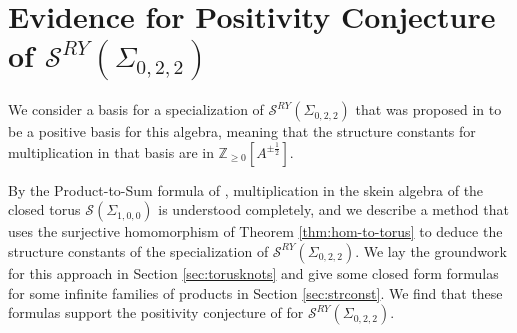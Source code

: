 \documentclass{article}
\newcommand{\del}{\partial}
\newcommand{\Z}{\mathbb{Z}}
\newcommand{\id}{\text{id}}
\renewcommand{\v}{\mathbf{v}}
\renewcommand{\a}{\alpha}
\renewcommand{\b}{\beta}
\renewcommand{\S}{\mathcal{S}}
\newcommand{\san}{\Sigma_{0,2,2}}
\newcommand{\sto}{\Sigma_{1,0,0}}
\theoremstyle{definition}
\renewcommand{\a}{\alpha}
\renewcommand{\b}{\beta}
\renewcommand{\san}{\Sigma_{0, 2, 2}}
\begin{document}

    




\section{Evidence for Positivity Conjecture of $\S^{RY}(\san)$} \label{sec:pos}

We consider a basis for a specialization of $\S^{RY}(\san)$ that was proposed in \cite{KaruoPositive} to be a positive basis for this algebra, meaning that the structure constants for multiplication in that basis are in $\Z_{\geq 0} [ A^{\pm \frac12}]$.   

By the Product-to-Sum formula of \cite{FrohmanGelca}, multiplication in the skein algebra of the closed torus $\S(\sto)$ is understood completely, and we describe a method that uses the  surjective homomorphism of Theorem \ref{thm:hom-to-torus} to deduce the structure constants of the specialization of $\S^{RY}(\san)$.  
We lay the groundwork for this approach in Section \ref{sec:torusknots} and give some closed form formulas for some infinite families of products in Section \ref{sec:strconst}.   We find that these formulas support the positivity conjecture of \cite{KaruoPositive} for  $\S^{RY}(\san)$. 
\end{document}
